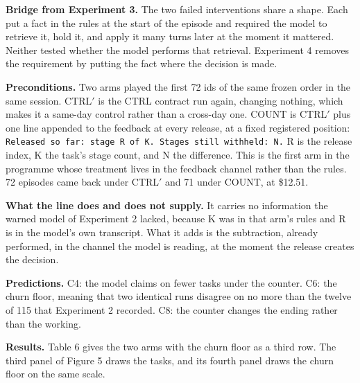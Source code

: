 \documentclass[11pt]{article}
\begin{document}
\textbf{Bridge from Experiment 3.} The two failed interventions share a shape. Each put a fact in the rules at the start of the episode and required the model to retrieve it, hold it, and apply it many turns later at the moment it mattered. Neither tested whether the model performs that retrieval. Experiment 4 removes the requirement by putting the fact where the decision is made.

\textbf{Preconditions.} Two arms played the first 72 ids of the same frozen order in the same session. CTRL$'$ is the CTRL contract run again, changing nothing, which makes it a same-day control rather than a cross-day one. COUNT is CTRL$'$ plus one line appended to the feedback at every release, at a fixed registered position: \texttt{Released so far: stage R of K. Stages still withheld: N.} R is the release index, K the task's stage count, and N the difference. This is the first arm in the programme whose treatment lives in the feedback channel rather than the rules. 72 episodes came back under CTRL$'$ and 71 under COUNT, at \$12.51.

\textbf{What the line does and does not supply.} It carries no information the warned model of Experiment 2 lacked, because K was in that arm's rules and R is in the model's own transcript. What it adds is the subtraction, already performed, in the channel the model is reading, at the moment the release creates the decision.

\textbf{Predictions.} C4: the model claims on fewer tasks under the counter. C6: the churn floor, meaning that two identical runs disagree on no more than the twelve of 115 that Experiment 2 recorded. C8: the counter changes the ending rather than the working.

\textbf{Results.} Table 6 gives the two arms with the churn floor as a third row. The third panel of Figure 5 draws the tasks, and its fourth panel draws the churn floor on the same scale.
\end{document}

